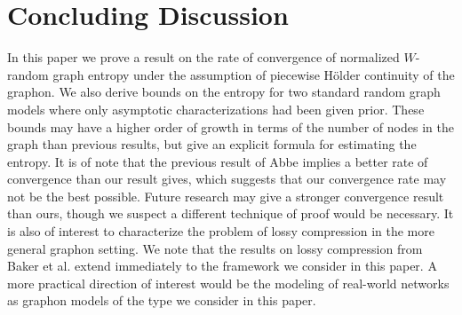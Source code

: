 \documentclass{svproc}
\newcommand{\1}{\mathbbm{1}}
\begin{document}
\section{Concluding Discussion}\label{sec4}

In this paper we prove a result on the rate of convergence of normalized $W$-random graph entropy under the assumption of piecewise H\"{o}lder continuity of the graphon. We also derive bounds on the entropy for two standard random graph models where only asymptotic characterizations had been given prior. These bounds may have a higher order of growth in terms of the number of nodes in the graph than previous results, but give an explicit formula for estimating the entropy. It is of note that the previous result of Abbe \cite{abbe2016} implies a better rate of convergence than our result gives, which suggests that our convergence rate may not be the best possible. Future research may give a stronger convergence result than ours, though we suspect a different technique of proof would be necessary. It is also of interest to characterize the problem of lossy compression in the more general graphon setting. We note that the results on lossy compression from Baker et al. extend immediately to the framework we consider in this paper. A more practical direction of interest would be the modeling of real-world networks as graphon models of the type we consider in this paper.
\end{document}
